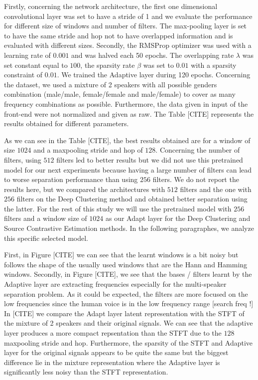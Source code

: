 \documentclass[master, tikz, final,11pt, dvipdfmx]{iscs-thesis}
\begin{document}
Firstly, concerning the network architecture, the first one dimensional convolutional layer was set to have a stride of 1 and we evaluate the performance for different size of windows and number of filters. The max-pooling layer is set to have the same stride and hop not to have overlapped information and is evaluated with different sizes. 
Secondly, the RMSProp optimizer was used with a learning rate of $0.001$ and was halved each 50 epochs. The overlapping rate $\lambda$ was set constant equal to $100$, the sparsity rate $\beta$ was set to $0.01$ with a sparsity constraint of $0.01$. 
We trained the Adaptive layer during 120 epochs.
Concerning the dataset, we used a mixture of 2 speakers with all possible genders combination (male/male, female/female and male/female) to cover as many frequency combinations as possible. Furthermore, the data given in input of the front-end were not normalized and given as raw. 
The Table [CITE] represents the results obtained for different parameters.

	
As we can see in the Table [CITE], the best results obtained are for a window of size $1024$ and a maxpooling stride and hop of $128$. Concerning the number of filters, using $512$ filters led to better results but we did not use this pretrained model for our next experiments because having a large number of filters can lead to worse separation performance than using $256$ filters. We do not report the results here, but we compared the architectures with $512$ filters and the one with $256$ filters on the Deep Clustering method and obtained better separation using the latter.
For the rest of this study we will use the pretrained model with $256$ filters and a window size of $1024$ as our Adapt layer for the Deep Clustering and Source 
Contrastive Estimation methods. In the following paragraphes, we analyze this specific selected model.

First, in Figure [CITE] we can see that the learnt windows is a bit noisy but follows the shape of the usually used windows that are the Hann and Hamming windows.
Secondly, in Figure [CITE], we see that the bases / filters learnt by the Adaptive layer are extracting frequencies especially for the multi-speaker separation problem. As it could be expected, the filters are more focused on the low frequencies since the human voice is in the low frequency range [search freq !]
In [CITE] we compare the Adapt layer latent representation with the STFT of the mixture of 2 speakers and their original signals. We can see that the adaptive layer produces a more compact repsentation than the STFT due to the $128$ maxpooling stride and hop. Furthermore, the sparsity of the STFT and Adaptive layer for the original signals appears to be quite the same but the biggest difference lie in the mixture representation where the Adaptive layer is significantly less noisy than the STFT representation.
\end{document}
